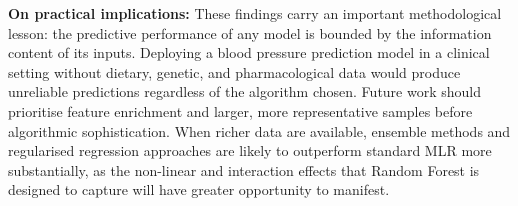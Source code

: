 ﻿\documentclass[conference]{IEEEtran}
\begin{document}
\textbf{On practical implications:} These findings carry an important methodological lesson: the predictive performance of any model is bounded by the information content of its inputs. Deploying a blood pressure prediction model in a clinical setting without dietary, genetic, and pharmacological data would produce unreliable predictions regardless of the algorithm chosen. Future work should prioritise feature enrichment and larger, more representative samples before algorithmic sophistication. When richer data are available, ensemble methods and regularised regression approaches are likely to outperform standard MLR more substantially, as the non-linear and interaction effects that Random Forest is designed to capture will have greater opportunity to manifest.

\end{document}
